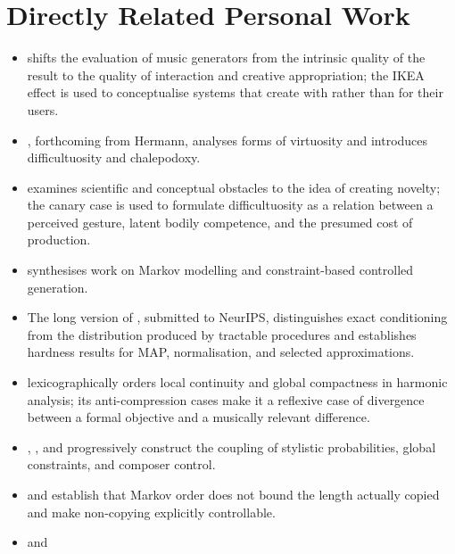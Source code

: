 \documentclass[11pt,a4paper]{article}
\begin{document}
\section{Directly Related Personal Work}

\begin{itemize}
  \item \textcite{pachet2026generation} shifts the evaluation of music
        generators from the intrinsic quality of the result to the quality of
        interaction and creative appropriation; the IKEA effect is used to
        conceptualise systems that create with rather than for their users.
  \item \textcite{pachet2027virtuosite}, forthcoming from Hermann, analyses
        forms of virtuosity and introduces difficultuosity and chalepodoxy.
  \item \textcite{pachet2026impossibilite} examines scientific and conceptual
        obstacles to the idea of creating novelty; the canary case is used to
        formulate difficultuosity as a relation between a perceived gesture,
        latent bodily competence, and the presumed cost of production.
  \item \textcite{pachet2026markov} synthesises work on Markov modelling and
        constraint-based controlled generation.
  \item The long version of \textcite{pachet2026biases}, submitted to NeurIPS,
        distinguishes exact conditioning from the distribution produced by
        tractable procedures and establishes hardness results for MAP,
        normalisation, and selected approximations.
  \item \textcite{pachet2026tonalparsimony} lexicographically orders local
        continuity and global compactness in harmonic analysis; its
        anti-compression cases make it a reflexive case of divergence between a
        formal objective and a musically relevant difference.
  \item \textcite{pachet2011markov}, \textcite{barbieri2012lyrics}, and
        \textcite{papadopoulos2016flowcomposer} progressively construct the
        coupling of stylistic probabilities, global constraints, and composer
        control.
  \item \textcite{papadopoulos2014avoiding} and
        \textcite{papadopoulos2016nonplagiaristic} establish that Markov order
        does not bound the length actually copied and make non-copying explicitly
        controllable.
  \item \textcite{ghedini2015flowmachines} and

\end{itemize}
\end{document}
